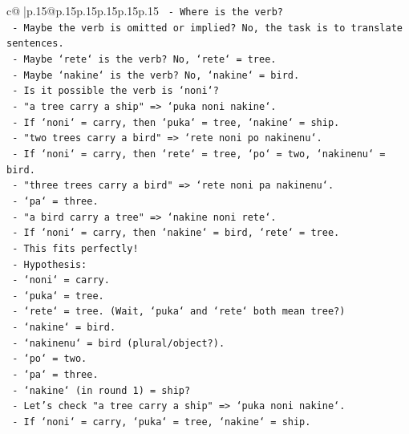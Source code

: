 \documentclass{article}
\begin{document}
{\begin{supertabular}{c@{$\;$}|p{.15\linewidth}@{}p{.15\linewidth}p{.15\linewidth}p{.15\linewidth}p{.15\linewidth}p{.15\linewidth}}
{{{\texttt{          {-} Where is the verb?} \\
\texttt{          {-} Maybe the verb is omitted or implied? No, the task is to translate sentences.} \\
\texttt{          {-} Maybe `rete` is the verb? No, `rete` = tree.} \\
\texttt{          {-} Maybe `nakine` is the verb? No, `nakine` = bird.} \\
\texttt{          {-} Is it possible the verb is `noni`?} \\
\texttt{          {-} "a tree carry a ship" => `puka noni nakine`.} \\
\texttt{          {-} If `noni` = carry, then `puka` = tree, `nakine` = ship.} \\
\texttt{          {-} "two trees carry a bird" => `rete noni po nakinenu`.} \\
\texttt{          {-} If `noni` = carry, then `rete` = tree, `po` = two, `nakinenu` = bird.} \\
\texttt{          {-} "three trees carry a bird" => `rete noni pa nakinenu`.} \\
\texttt{          {-} `pa` = three.} \\
\texttt{          {-} "a bird carry a tree" => `nakine noni rete`.} \\
\texttt{          {-} If `noni` = carry, then `nakine` = bird, `rete` = tree.} \\
\texttt{          {-} This fits perfectly!} \\
\texttt{          {-} Hypothesis:} \\
\texttt{            {-} `noni` = carry.} \\
\texttt{            {-} `puka` = tree.} \\
\texttt{            {-} `rete` = tree. (Wait, `puka` and `rete` both mean tree?)} \\
\texttt{            {-} `nakine` = bird.} \\
\texttt{            {-} `nakinenu` = bird (plural/object?).} \\
\texttt{            {-} `po` = two.} \\
\texttt{            {-} `pa` = three.} \\
\texttt{            {-} `nakine` (in round 1) = ship?} \\
\texttt{            {-} Let's check "a tree carry a ship" => `puka noni nakine`.} \\
\texttt{              {-} If `noni` = carry, `puka` = tree, `nakine` = ship.} \\
}}}
\end{supertabular}}
\end{document}
